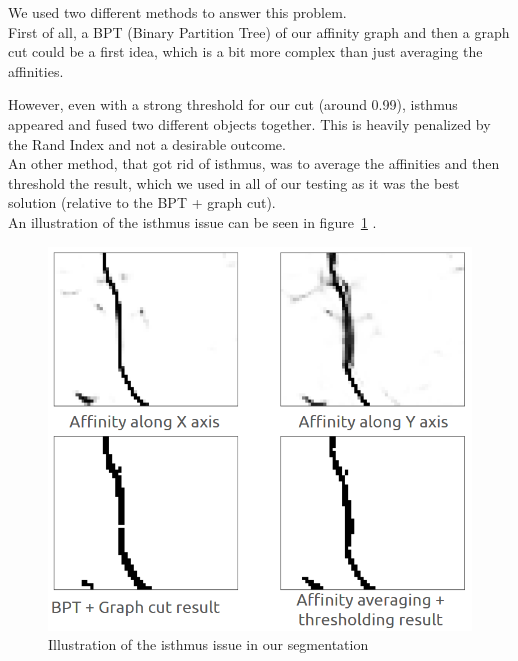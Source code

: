 We used two different methods to answer this problem.\\
First of all, a BPT (Binary Partition Tree) of our affinity graph and then a
graph cut could be a first idea, which is a bit more complex than just
averaging the affinities. 

However, even with a strong threshold for our cut (around 0.99), isthmus appeared and fused two different objects together.
This is heavily penalized by the Rand Index and not a desirable outcome.\\
An other method, that got rid of isthmus, was to average the affinities and
then threshold the result, which we used in all of our testing as it was the best solution
(relative to the BPT + graph cut).\\
An illustration of the isthmus issue can be seen in
figure~\ref{fig:cremi_isthmus} .


\begin{figure}[!htbp]
	\centering
	\includegraphics[width=0.7\linewidth]{./images/cremi_isthmus.png}
	\caption{Illustration of the isthmus issue in our segmentation}%
	\label{fig:cremi_isthmus}
\end{figure}

